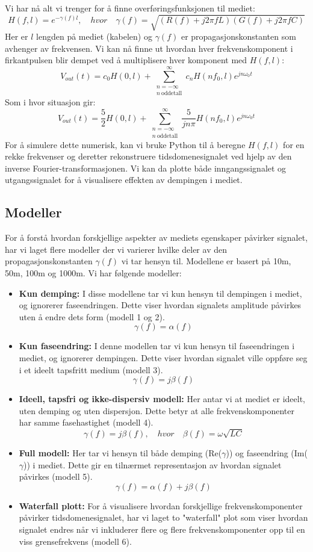 \noindent Vi har nå alt vi trenger for å finne overføringsfunksjonen til mediet:
\[
    H(f, l) = e^{-\gamma(f) l}, \quad hvor \quad \gamma(f) = \sqrt{(R(f) + j 2\pi f L)(G(f) + j 2\pi f C)}
\]
Her er $l$ lengden på mediet (kabelen) og $\gamma(f)$ er propagasjonskonstanten som avhenger av frekvensen.
Vi kan nå finne ut hvordan hver frekvenskomponent i firkantpulsen blir dempet ved å multiplisere hver komponent med $H(f, l)$:
\[
    V_{out}(t) = c_0H(0, l) + \sum_{\substack{n=-\infty\\ n\ \text{oddetall}}}^{\infty} c_n H(n f_0, l) e^{j n \omega_0 t}
\]
Som i hvor situasjon gir:
\[
    V_{out}(t) = \frac{5}{2}H(0, l) + \sum_{\substack{n=-\infty\\ n\ \text{oddetall}}}^{\infty} \frac{5}{j n \pi} H(n f_0, l) e^{j n \omega_0 t}    
\]
For å simulere dette numerisk, kan vi bruke Python til å beregne $H(f, l)$ for en rekke frekvenser og deretter rekonstruere tidsdomenesignalet ved hjelp av den inverse Fourier-transformasjonen.
Vi kan da plotte både inngangssignalet og utgangssignalet for å visualisere effekten av dempingen i mediet.
\clearpage
\subsection{Modeller}
For å forstå hvordan forskjellige aspekter av mediets egenskaper påvirker signalet, har vi laget flere modeller der vi varierer hvilke deler av den propagasjonskonstanten $\gamma(f)$ vi tar hensyn til. Modellene er basert på 10m, 50m, 100m og 1000m. Vi har følgende modeller:
\begin{itemize}
    \item \textbf{Kun demping:} I disse modellene tar vi kun hensyn til dempingen i mediet, og ignorerer faseendringen. Dette viser hvordan signalets amplitude påvirkes uten å endre dets form (modell 1 og 2).
    \[
        \gamma(f) = \alpha(f)
    \]
    \item \textbf{Kun faseendring:} I denne modellen tar vi kun hensyn til faseendringen i mediet, og ignorerer dempingen. Dette viser hvordan signalet ville oppføre seg i et ideelt tapsfritt medium (modell 3).
    \[
        \gamma(f) = j\beta(f)
    \]
    \item \textbf{Ideell, tapsfri og ikke-dispersiv modell:} Her antar vi at mediet er ideelt, uten demping og uten dispersjon. Dette betyr at alle frekvenskomponenter har samme fasehastighet (modell 4).
    \[
        \gamma(f) = j\beta(f), \quad hvor \quad \beta(f) = \omega\sqrt{LC}
    \]
    \item \textbf{Full modell:} Her tar vi hensyn til både demping (Re($\gamma$)) og faseendring (Im($\gamma$)) i mediet. Dette gir en tilnærmet representasjon av hvordan signalet påvirkes (modell 5).
    \[
        \gamma(f) = \alpha(f) + j\beta(f)
    \]
    \item \textbf{Waterfall plott:} For å visualisere hvordan forskjellige frekvenskomponenter påvirker tidsdomenesignalet, har vi laget to "waterfall" plot som viser hvordan signalet endres når vi inkluderer flere og flere frekvenskomponenter opp til en viss grensefrekvens (modell 6).
\end{itemize}
\clearpage
